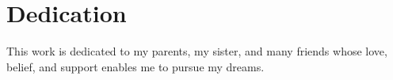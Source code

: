\chapter*{Dedication}

This work is dedicated to my parents, my sister, and many friends whose love, belief, and support enables me to pursue my dreams.  